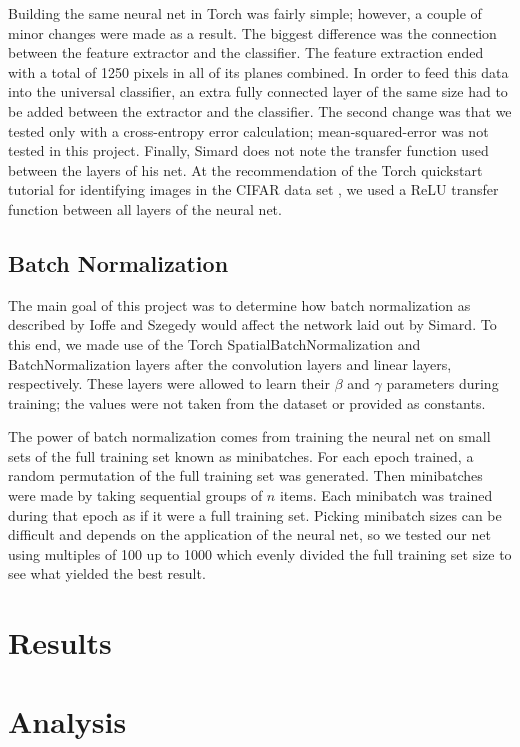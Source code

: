 \documentclass{article}
\begin{document}
Building the same neural net in Torch was fairly simple; however, a couple of minor changes were made as a result. The biggest difference was the connection between the feature extractor and the classifier. The feature extraction ended with a total of 1250 pixels in all of its planes combined. In order to feed this data into the universal classifier, an extra fully connected layer of the same size had to be added between the extractor and the classifier. The second change was that we tested only with a cross-entropy error calculation; mean-squared-error was not tested in this project. Finally, Simard does not note the transfer function used between the layers of his net. At the recommendation of the Torch quickstart tutorial \cite{torchTutorial} for identifying images in the CIFAR data set \cite{krizhevsky2009learning}, we used a ReLU transfer function between all layers of the neural net.

\subsection{Batch Normalization}
The main goal of this project was to determine how batch normalization as described by Ioffe and Szegedy would affect the network laid out by Simard. To this end, we made use of the Torch SpatialBatchNormalization and BatchNormalization layers after the convolution layers and linear layers, respectively. These layers were allowed to learn their $\beta$ and $\gamma$ parameters during training; the values were not taken from the dataset or provided as constants.

The power of batch normalization comes from training the neural net on small sets of the full training set known as minibatches. For each epoch trained, a random permutation of the full training set was generated. Then minibatches were made by taking sequential groups of $n$ items. Each minibatch was trained during that epoch as if it were a full training set. Picking minibatch sizes can be difficult and depends on the application of the neural net, so we tested our net using multiples of 100 up to 1000 which evenly divided the full training set size to see what yielded the best result.


\section{Results}

\section{Analysis}
\end{document}
